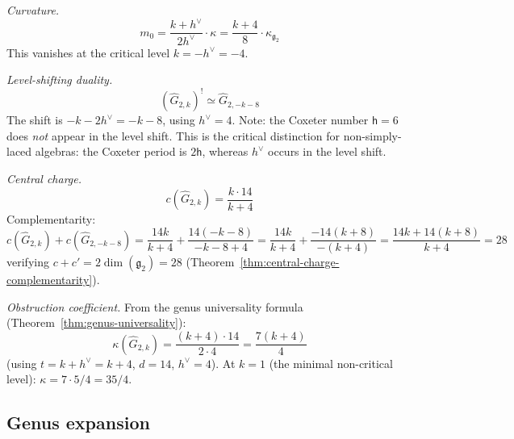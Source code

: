 \begin{computation}
\label{comp:G2-curvature}

\emph{Curvature.}
\begin{equation}
m_0 = \frac{k + h^\vee}{2h^\vee}\cdot\kappa
= \frac{k+4}{8}\cdot\kappa_{\mathfrak{g}_2}
\end{equation}
This vanishes at the critical level $k = -h^\vee = -4$.

\emph{Level-shifting duality.}
\begin{equation}\label{eq:G2-level-shift}
(\widehat{G}_{2,k})^! \simeq \widehat{G}_{2,-k-8}
\end{equation}
The shift is $-k - 2h^\vee = -k - 8$, using $h^\vee = 4$.
Note: the Coxeter number $\mathsf{h} = 6$ does \emph{not} appear in the
level shift.  This is the critical distinction for non-simply-laced
algebras: the Coxeter period is $2\mathsf h$, whereas $h^\vee$ occurs in the level shift.

\emph{Central charge.}
\begin{equation}
c(\widehat{G}_{2,k}) = \frac{k \cdot 14}{k + 4}
\end{equation}
Complementarity:
\begin{equation}
c(\widehat{G}_{2,k}) + c(\widehat{G}_{2,-k-8})
= \frac{14k}{k+4} + \frac{14(-k-8)}{-k-8+4}
= \frac{14k}{k+4} + \frac{-14(k+8)}{-(k+4)}
= \frac{14k + 14(k+8)}{k+4} = 28
\end{equation}
verifying $c + c' = 2\dim(\mathfrak{g}_2) = 28$
(Theorem~\ref{thm:central-charge-complementarity}).

\emph{Obstruction coefficient.}
From the genus universality formula
(Theorem~\ref{thm:genus-universality}):
\begin{equation}\label{eq:G2-kappa}
\kappa(\widehat{G}_{2,k}) = \frac{(k+4) \cdot 14}{2 \cdot 4}
= \frac{7(k+4)}{4}
\end{equation}
(using $t = k + h^\vee = k + 4$, $d = 14$, $h^\vee = 4$).
At $k = 1$ (the minimal non-critical level):
$\kappa = 7 \cdot 5/4 = 35/4$.
\end{computation}

\subsection{Genus expansion}

